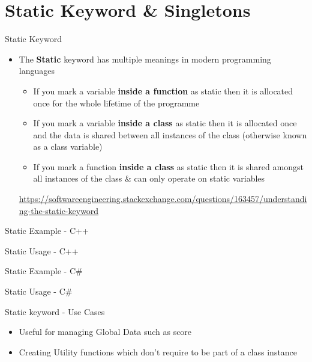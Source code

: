 \part{Static Keyword \& Singletons}
\frame{\partpage}

\begin{frame}{Static Keyword}
	\begin{itemize}
		\pause \item The \textbf{Static} keyword has multiple meanings in modern programming languages
		\begin{itemize}
			\pause \item If you mark a variable \textbf{inside a function} as static then it is allocated once for the whole lifetime of the programme
			\pause \item If you mark a variable \textbf{inside a class} as static then it is allocated once and the data is shared between all instances of the class (otherwise known as a class variable)
			\pause \item If you mark a function \textbf{inside a class} as static then it is shared amongst all instances of the class \& can only operate on static variables
		\end{itemize}
		\pause \url{https://softwareengineering.stackexchange.com/questions/163457/understanding-the-static-keyword}
	\end{itemize}
\end{frame}

\begin{frame}[fragile]{Static Example - C++}
\end{frame}

\begin{frame}[fragile]{Static Usage - C++}
\end{frame}

\begin{frame}[fragile]{Static Example - C\#}
\end{frame}

\begin{frame}[fragile]{Static Usage - C\#}
\end{frame}

\begin{frame}{Static keyword - Use Cases}
	\begin{itemize}
		\pause \item Useful for managing Global Data such as score 
		\pause \item Creating Utility functions which don't require to be part of a class instance
	\end{itemize}
\end{frame}

